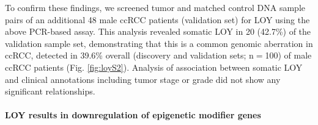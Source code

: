 To confirm these findings, we screened tumor and matched control DNA sample pairs of an additional 48 male ccRCC patients (validation set) for LOY using the above PCR-based assay.
This analysis revealed somatic LOY in 20 (42.7\%) of the validation sample set, demonstrating that this is a common genomic aberration in ccRCC, detected in 39.6\% overall (discovery and validation sets; n$=$100) of male ccRCC patients (Fig. \ref{fig:loyS2}).
Analysis of association between somatic LOY and clinical annotations including tumor stage or grade did not show any significant relationships.

\paragraph{LOY results in downregulation of epigenetic modifier genes}

